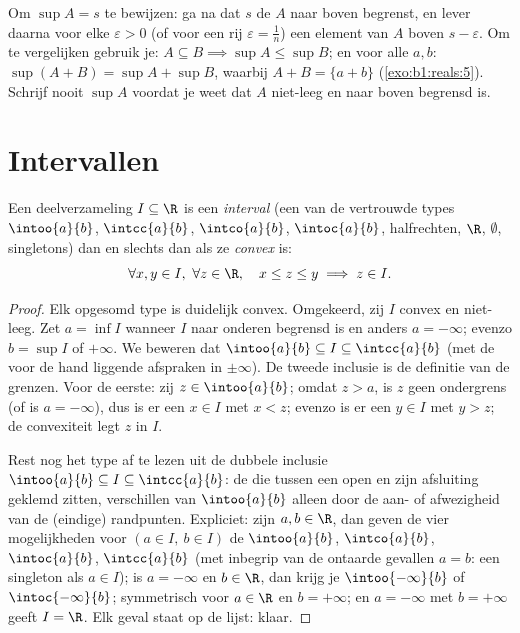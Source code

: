 \begin{method}\label{met:b1:reals:supproofs}
Om $\sup A = s$ te bewijzen: ga na dat $s$ de  $A$ naar boven
begrenst, en lever daarna voor elke $\varepsilon > 0$ (of voor een rij
$\varepsilon = \frac 1n$) een element van $A$ boven $s - \varepsilon$. Om
 te vergelijken gebruik je: $A \subseteq B \implies \sup A \leq
\sup B$; en voor alle $a, b$: $\sup(A + B) = \sup A + \sup B$, waarbij $A
+ B = \{a + b\}$ (\cref{exo:b1:reals:5}). Schrijf nooit $\sup A$ voordat
je weet dat $A$ niet-leeg en naar boven begrensd is.
\end{method}

\section{Intervallen}

\begin{proposition}\label{prop:b1:reals:intervals}
Een deelverzameling $I \subseteq \R$ is een
\emph{interval} (een van de vertrouwde types
$\intoo{a}{b}$, $\intcc{a}{b}$, $\intco{a}{b}$, $\intoc{a}{b}$,
halfrechten, $\R$, $\emptyset$, singletons) dan en slechts dan als ze
\emph{convex} is:
\[
\forall x, y \in I,\ \forall z \in \R, \quad
x \leq z \leq y \implies z \in I .
\]
\end{proposition}

\begin{proof}
Elk opgesomd type is duidelijk convex. Omgekeerd, zij $I$ convex en
niet-leeg. Zet $a = \inf I$ wanneer $I$ naar onderen begrensd is en
anders $a = -\infty$; evenzo $b = \sup I$ of $+\infty$. We beweren dat
$\intoo{a}{b} \subseteq I \subseteq \intcc{a}{b}$ (met de voor de hand
liggende afspraken in $\pm\infty$). De tweede inclusie is de definitie
van de grenzen. Voor de eerste: zij $z \in \intoo{a}{b}$; omdat $z > a$,
is $z$ geen ondergrens (of is $a = -\infty$), dus is er een $x \in I$ met
$x < z$; evenzo is er een $y \in I$ met $y > z$; de convexiteit legt $z$
in $I$.

Rest nog het type af te lezen uit de dubbele inclusie $\intoo{a}{b}
\subseteq I \subseteq \intcc{a}{b}$: de  die tussen een open
 en zijn afsluiting geklemd zitten, verschillen van
$\intoo{a}{b}$ alleen door de aan- of afwezigheid van de (eindige)
randpunten. Expliciet: zijn $a, b \in \R$, dan geven de vier
mogelijkheden voor $(a \in I,\ b \in I)$ de  $\intoo{a}{b}$,
$\intco{a}{b}$, $\intoc{a}{b}$, $\intcc{a}{b}$ (met inbegrip van de
ontaarde gevallen $a = b$: een singleton als $a \in I$); is $a = -\infty$
en $b \in \R$, dan krijg je $\intoo{-\infty}{b}$ of
$\intoc{-\infty}{b}$; symmetrisch voor $a \in \R$ en $b = +\infty$; en $a
= -\infty$ met $b = +\infty$ geeft $I = \R$. Elk geval staat op de
lijst: klaar.
\end{proof}


